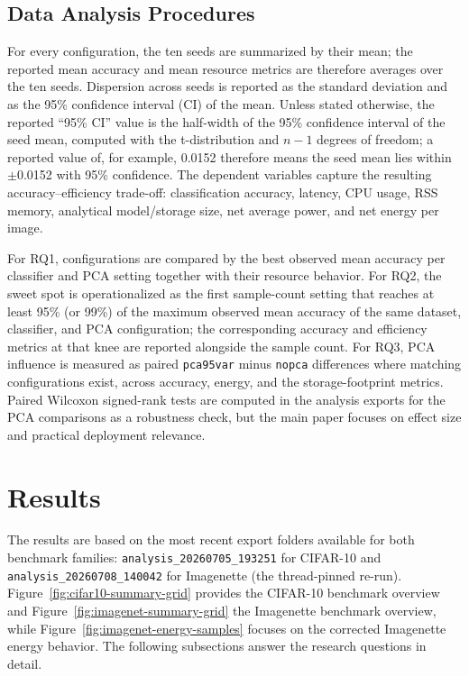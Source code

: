 \documentclass[sigconf,review]{acmart}
\begin{document}
\subsection{Data Analysis Procedures}
\label{sec:analysis}
For every configuration, the ten seeds are summarized by their mean; the reported mean accuracy and mean resource metrics are therefore averages over the ten seeds.
Dispersion across seeds is reported as the standard deviation and as the 95\% confidence interval (CI) of the mean.
Unless stated otherwise, the reported ``95\% CI'' value is the half-width of the 95\% confidence interval of the seed mean, computed with the t-distribution and $n-1$ degrees of freedom; a reported value of, for example, 0.0152 therefore means the seed mean lies within $\pm$0.0152 with 95\% confidence.
The dependent variables capture the resulting accuracy--efficiency trade-off: classification accuracy, latency, CPU usage, RSS memory, analytical model/storage size, net average power, and net energy per image.

For RQ1, configurations are compared by the best observed mean accuracy per classifier and PCA setting together with their resource behavior.
For RQ2, the sweet spot is operationalized as the first sample-count setting that reaches at least 95\% (or 99\%) of the maximum observed mean accuracy of the same dataset, classifier, and PCA configuration; the corresponding accuracy and efficiency metrics at that knee are reported alongside the sample count.
For RQ3, PCA influence is measured as paired \texttt{pca95var} minus \texttt{nopca} differences where matching configurations exist, across accuracy, energy, and the storage-footprint metrics.
Paired Wilcoxon signed-rank tests are computed in the analysis exports for the PCA comparisons as a robustness check, but the main paper focuses on effect size and practical deployment relevance.

\section{Results}
\label{sec:results}
The results are based on the most recent export folders available for both benchmark families: \texttt{analysis\_20260705\_193251} for CIFAR-10 and \texttt{analysis\_20260708\_140042} for Imagenette (the thread-pinned re-run).
Figure~\ref{fig:cifar10-summary-grid} provides the CIFAR-10 benchmark overview and Figure~\ref{fig:imagenet-summary-grid} the Imagenette benchmark overview, while Figure~\ref{fig:imagenet-energy-samples} focuses on the corrected Imagenette energy behavior.
The following subsections answer the research questions in detail.
\end{document}

